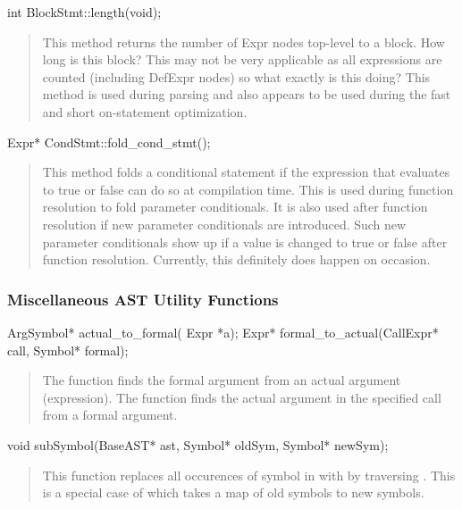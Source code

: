\documentclass[10pt]{article}
\begin{document}
\begin{clang}
int BlockStmt::length(void);
\end{clang}
\begin{quote}
This method returns the number of Expr nodes top-level to a block.
How long is this block?  This may not be very applicable as all
expressions are counted (including DefExpr nodes) so what exactly is
this doing?  This method is used during parsing and also appears to be
used during the fast and short on-statement optimization.
\end{quote}

\begin{clang}
Expr* CondStmt::fold_cond_stmt();
\end{clang}
\begin{quote}
This method folds a conditional statement if the expression that
evaluates to true or false can do so at compilation time.  This is
used during function resolution to fold parameter conditionals.  It is
also used after function resolution if new parameter conditionals are
introduced.  Such new parameter conditionals show up if a value is
changed to true or false after function resolution.  Currently, this
definitely does happen on occasion.
\end{quote}

\subsubsection{Miscellaneous AST Utility Functions}

\begin{clang}
ArgSymbol* actual_to_formal( Expr *a);
Expr* formal_to_actual(CallExpr* call, Symbol* formal);
\end{clang}
\begin{quote}
The function  finds the formal argument from an
actual argument (expression).  The function 
finds the actual argument in the specified call from a formal
argument.
\end{quote}

\begin{clang}
void subSymbol(BaseAST* ast, Symbol* oldSym, Symbol* newSym);
\end{clang}
\begin{quote}
This function replaces all occurences of symbol  in
 with  by traversing .  This is a special
case of  which takes a map of old symbols to new
symbols.
\end{quote}
\end{document}
